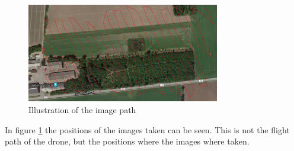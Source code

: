 \documentclass[../Head/Main.tex]{subfiles}
\begin{document}
\begin{figure}[H]
	\centering
	\includegraphics[width=0.75\textwidth]{../Figures/Flight_path}
	\caption{Illustration of the image path}
	\label{fig:flight_path}
\end{figure}
In figure \ref{fig:flight_path} the positions of the images taken can be seen. This is not the flight path of the drone, but the positions where the images where taken.
\end{document}
